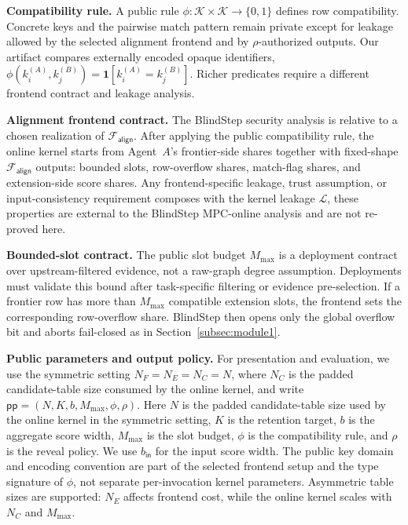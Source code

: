 \documentclass[conference,compsoc,letterpaper]{IEEEtran}
\theoremstyle{definition}
\theoremstyle{remark}
\newcommand{\BlindStep}{BlindStep\xspace}
\newcommand{\Leak}{\mathcal{L}}
\newcommand{\Falign}{\mathcal{F}_{\mathsf{align}}}
\newcommand{\pp}{\mathsf{pp}}
\newcommand{\Mmax}{M_{\max}}
\newcommand{\compat}{\phi}
\newcommand{\policy}{\rho}
\newcommand{\scorebits}{b}
\begin{document}
\noindent\textbf{Compatibility rule.}
A public rule $\compat:\mathcal K\times\mathcal K\to\{0,1\}$ defines row compatibility. Concrete keys and the pairwise match pattern remain private except for leakage allowed by the selected alignment frontend and by $\policy$-authorized outputs.
Our artifact compares externally encoded opaque identifiers, $\compat(k_i^{(A)},k_j^{(B)})=\mathbf 1[k_i^{(A)}=k_j^{(B)}]$.
Richer predicates require a different frontend contract and leakage analysis.

\noindent\textbf{Alignment frontend contract.}
The \BlindStep{} security analysis is relative to a chosen realization of $\Falign{}$.
After applying the public compatibility rule, the online kernel starts from Agent~$A$'s frontier-side shares together with fixed-shape $\Falign{}$ outputs: bounded slots, row-overflow shares, match-flag shares, and extension-side score shares.
Any frontend-specific leakage, trust assumption, or input-consistency requirement composes with the kernel leakage $\Leak$, these properties are external to the \BlindStep{} MPC-online analysis and are not re-proved here.

\noindent\textbf{Bounded-slot contract.}
The public slot budget $\Mmax$ is a deployment contract over upstream-filtered evidence, not a raw-graph degree assumption.
Deployments must validate this bound after task-specific filtering or evidence pre-selection.
If a frontier row has more than $\Mmax$ compatible extension slots, the frontend sets the corresponding row-overflow share.
\BlindStep{} then opens only the global overflow bit and aborts fail-closed as in Section~\ref{subsec:module1}.

\noindent\textbf{Public parameters and output policy.}
For presentation and evaluation, we use the symmetric setting $N_F=N_E=N_C=N$, where $N_C$ is the padded candidate-table size consumed by the online kernel, and write $\pp=(N,K,\scorebits,\Mmax,\compat,\policy)$.
Here $N$ is the padded candidate-table size used by the online kernel in the symmetric setting, $K$ is the retention target, $\scorebits$ is the aggregate score width, $\Mmax$ is the slot budget, $\compat$ is the compatibility rule, and $\policy$ is the reveal policy.
We use $b_{\mathsf{in}}$ for the input score width.
The public key domain and encoding convention are part of the selected frontend setup and the type signature of $\compat$, not separate per-invocation kernel parameters.
Asymmetric table sizes are supported: $N_E$ affects frontend cost, while the online kernel scales with $N_C$ and $\Mmax$.
\end{document}
